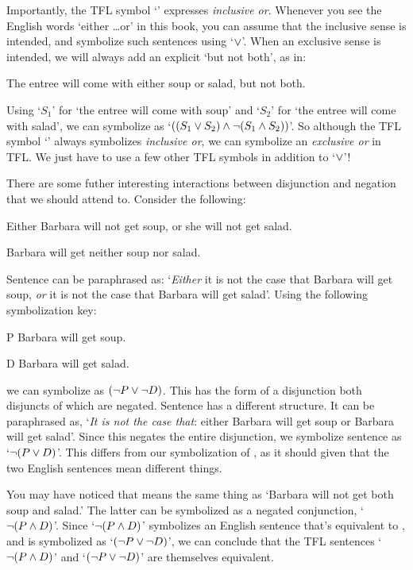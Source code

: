Importantly, the TFL symbol `\eor' expresses \emph{inclusive or}.  Whenever you see the English words `either \ldots or' in this book, you can assume that the inclusive sense is intended, and symbolize such sentences using `$\vee$'.  When an exclusive sense is  intended, we will always add an explicit `but not both', as in:
	\begin{earg}
		\item[\ex{or.xor}] The entree will come with either soup or salad, but not both.
	\end{earg}
Using `$S_1$' for `the entree will come with soup' and `$S_2$' for `the entree will come with salad', we can symbolize  as `$((S_1 \vee S_2) \wedge \neg (S_1 \wedge S_2))$'.  So although the TFL symbol `\eor' always symbolizes \emph{inclusive or}, we can symbolize an \emph{exclusive or} in {TFL}. We just have to use a few other TFL symbols in addition to `$\vee$'!


There are some futher interesting interactions between disjunction and negation that we should attend to. Consider the following:

	\begin{earg}
		\item[\ex{or3}] Either Barbara will not get soup, or she will not get salad.
		\item[\ex{or4}] Barbara will get neither soup nor salad.
	\end{earg}
Sentence  can be paraphrased as: `\emph{Either} it is not the case that Barbara will get soup, \emph{or} it is not the case that Barbara will get salad'.  Using the following symbolization key:

	\begin{ekey}
		\item[P] Barbara will get soup. 
		\item[D] Barbara will get salad.
	\end{ekey}
we can symbolize  as $(\neg P \vee \neg D)$.  This has the form of a disjunction both disjuncts of which are negated.  Sentence  has a different structure. It can be paraphrased as, `\emph{It is not the case that}: either Barbara will get soup or Barbara will get salad'. Since this negates the entire disjunction, we symbolize sentence  as `$\neg (P \vee D)$'.  This differs from our symbolization of , as it should given that the two English sentences mean different things.

You may have noticed that  means the same thing as `Barbara will not get both soup and salad.'  The latter can be symbolized as a negated conjunction, `$\neg(P \wedge D)$'.  Since `$\neg(P \wedge D)$' symbolizes an English sentence that's equivalent to , and  is symbolized as `$(\neg P \vee \neg D)$', we can conclude that the TFL sentences `$\neg(P \wedge D)$'  and `$(\neg P \vee \neg D)$' are themselves equivalent.

